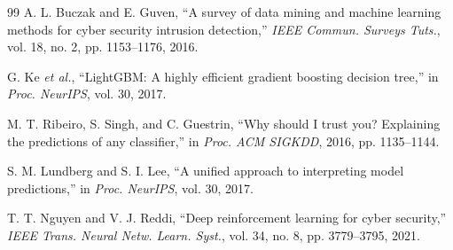 \documentclass[conference]{IEEEtran}
\begin{document}
\begin{thebibliography}{99}
A. L. Buczak and E. Guven, ``A survey of data mining and machine learning methods for cyber security intrusion detection,'' \emph{IEEE Commun. Surveys Tuts.}, vol. 18, no. 2, pp. 1153--1176, 2016.

G. Ke \emph{et al.}, ``LightGBM: A highly efficient gradient boosting decision tree,'' in \emph{Proc. NeurIPS}, vol. 30, 2017.

M. T. Ribeiro, S. Singh, and C. Guestrin, ``Why should I trust you? Explaining the predictions of any classifier,'' in \emph{Proc. ACM SIGKDD}, 2016, pp. 1135--1144.

S. M. Lundberg and S. I. Lee, ``A unified approach to interpreting model predictions,'' in \emph{Proc. NeurIPS}, vol. 30, 2017.

T. T. Nguyen and V. J. Reddi, ``Deep reinforcement learning for cyber security,'' \emph{IEEE Trans. Neural Netw. Learn. Syst.}, vol. 34, no. 8, pp. 3779--3795, 2021.

\end{thebibliography}

\balance
\end{document}
